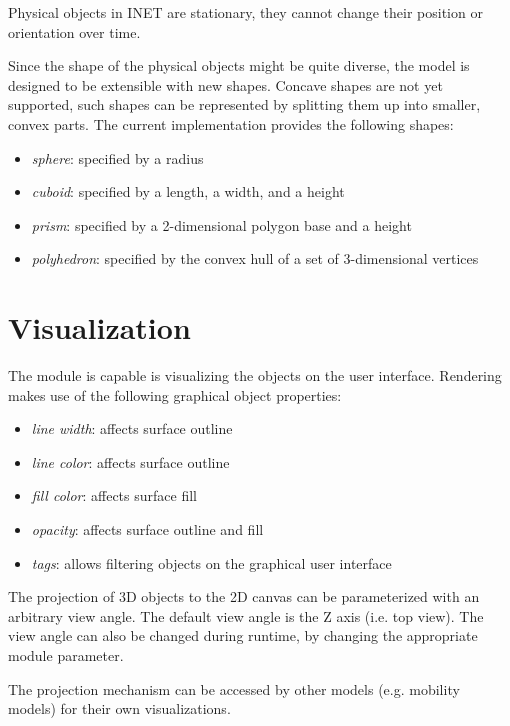 Physical objects in INET are stationary, they cannot change their position
or orientation over time.

Since the shape of the physical objects might be quite diverse, the model
is designed to be extensible with new shapes. Concave shapes are not yet
supported, such shapes can be represented by splitting them up into smaller,
convex parts. The current implementation provides the following shapes:

\begin{itemize}
  \item \textit{sphere}: specified by a radius
  \item \textit{cuboid}: specified by a length, a width, and a height
  \item \textit{prism}: specified by a 2-dimensional polygon base and a height
  \item \textit{polyhedron}: specified by the convex hull of a set of
    3-dimensional vertices
\end{itemize}

\section{Visualization}

The  module is capable is visualizing the objects on the
user interface. Rendering makes use of the following graphical object properties:

\begin{itemize}
  \item \textit{line width}: affects surface outline
  \item \textit{line color}: affects surface outline
  \item \textit{fill color}: affects surface fill
  \item \textit{opacity}: affects surface outline and fill
  \item \textit{tags}: allows filtering objects on the graphical user interface
\end{itemize}

The projection of 3D objects to the 2D canvas can be parameterized with an
arbitrary view angle. The default view angle is the Z axis (i.e. top view).
The view angle can also be changed during runtime, by changing the
appropriate module parameter.

The projection mechanism can be accessed by other models (e.g. mobility
models) for their own visualizations.

